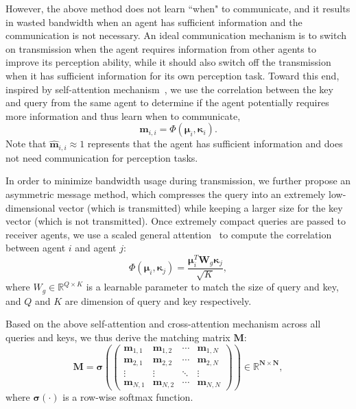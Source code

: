 % 
However, the above method does not learn ``when" to communicate, and it results in wasted bandwidth when an agent has sufficient information and the communication is not necessary. An ideal communication mechanism is to switch on transmission when the agent requires information from other agents to improve its perception ability, while it should also switch off the transmission when it has sufficient information for its own perception task. Toward this end, inspired by self-attention mechanism~\cite{cheng2016long}, we use the correlation between the key and query from the same agent to determine if the agent potentially requires more information and thus learn when to communicate,
\begin{equation}\label{eq:matching}
    \bm{m}_{i,i} = \Phi(\bm{\mu}_i, \bm{\kappa}_i).
\end{equation}
Note that $\hat{\bm{m}}_{i,i}\approx1$ represents that the agent has sufficient information and does not need communication for perception tasks.

In order to minimize bandwidth usage during transmission, we further propose an asymmetric message method, which compresses the query into an extremely low-dimensional vector (which is transmitted) while keeping a larger size for the key vector (which is not transmitted). Once extremely compact queries are passed to receiver agents, we use a scaled general attention~\cite{luong2015effective,vaswani2017attention} to compute the correlation between agent $i$ and agent $j$:
\begin{equation}\label{eq:matching_detail}
   \Phi(\bm{\mu}_i, \bm{\kappa}_j)= \frac{\bm{\mu}_i^T \bm{W}_g \bm{\kappa}_j}{\sqrt{K}},
\end{equation}
where $W_g \in \mathbb{R}^{Q \times K}$ is a learnable parameter to match the size of query and key, and $Q$ and $K$ are dimension of query and key respectively. 


Based on the above self-attention and cross-attention mechanism across all queries and keys, we thus derive the matching matrix $\bm{M}$:
\begin{equation}\label{eq:matching}
\bm{M} = 
 \bm{\sigma}(\begin{pmatrix}
  \bm{m}_{1,1} & \bm{m}_{1,2} & \cdots & \bm{m}_{1,N} \\
  \bm{m}_{2,1} & \bm{m}_{2,2} & \cdots & \bm{m}_{2,N} \\
  \vdots  & \vdots  & \ddots & \vdots  \\
  \bm{m}_{N,1} & \bm{m}_{N,2} & \cdots & \bm{m}_{N,N} 
 \end{pmatrix})\in\mathbb{R}^{\bm{N}\times \bm{N}},
\end{equation}
where $\bm{\sigma}(\cdot)$ is a row-wise softmax function.

